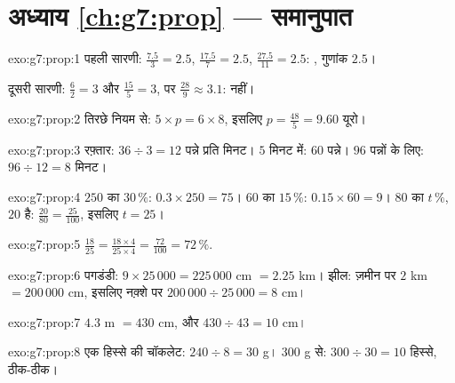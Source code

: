 \section*{अध्याय \ref{ch:g7:prop} --- समानुपात}

\begin{solution}{exo:g7:prop:1}
पहली सारणी:  $\frac{7.5}{3} = 2.5$, $\frac{17.5}{7} = 2.5$,
$\frac{27.5}{11} = 2.5$: , गुणांक $2.5$।

दूसरी सारणी: $\frac62 = 3$ और $\frac{15}{5} = 3$, पर
$\frac{28}{9} \approx 3.1$:  नहीं।
\end{solution}

\begin{solution}{exo:g7:prop:2}
तिरछे नियम से: $5 \times p = 6 \times 8$, इसलिए
$p = \frac{48}{5} = 9.60$ यूरो।
\end{solution}

\begin{solution}{exo:g7:prop:3}
रफ़्तार: $36 \div 3 = 12$ पन्ने प्रति मिनट। $5$ मिनट में:
$60$ पन्ने। $96$ पन्नों के लिए: $96 \div 12 = 8$ मिनट।
\end{solution}

\begin{solution}{exo:g7:prop:4}
$250$ का $30\,\%$: $0.3 \times 250 = 75$। \quad
$60$ का $15\,\%$: $0.15 \times 60 = 9$। \quad
$80$ का $t\,\%$, $20$ है: $\frac{20}{80} = \frac{25}{100}$, इसलिए
$t = 25$।
\end{solution}

\begin{solution}{exo:g7:prop:5}
$\frac{18}{25} = \frac{18 \times 4}{25 \times 4} = \frac{72}{100} =
72\,\%$.
\end{solution}

\begin{solution}{exo:g7:prop:6}
पगडंडी: $9 \times 25\,000 = 225\,000$ cm $= 2.25$ km।
झील: ज़मीन पर $2$ km $= 200\,000$ cm, इसलिए नक़्शे पर
$200\,000 \div 25\,000 = 8$ cm।
\end{solution}

\begin{solution}{exo:g7:prop:7}
$4.3$ m $= 430$ cm, और $430 \div 43 = 10$ cm।
\end{solution}

\begin{solution}{exo:g7:prop:8}
एक हिस्से की चॉकलेट: $240 \div 8 = 30$ g। $300$ g से:
$300 \div 30 = 10$ हिस्से, ठीक-ठीक।
\end{solution}

